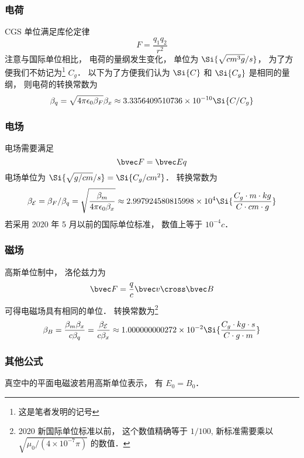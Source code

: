 

\subsubsection{电荷}
CGS 单位满足库伦定律
\begin{equation}\label{GaussU_eq1}
F = \frac{q_1 q_2}{r^2}
\end{equation}
注意与国际单位相比， 电荷的量纲发生变化， 单位为 $\Si{\sqrt{cm^3 g}/s}$， 为了方便我们不妨记为\footnote{这是笔者发明的记号} $C_g$． 以下为了方便我们认为 $\Si{C}$ 和 $\Si{C_g}$ 是相同的量纲， 则电荷的转换常数为
\begin{equation}
\beta_q = \sqrt{4\pi\epsilon_0\beta_F} \beta_x \approx 3.3356409510736\times 10^{-10} \Si{C/C_g}
\end{equation}

\subsubsection{电场}
电场需要满足
\begin{equation}
\bvec F = \bvec E q
\end{equation}
电场单位为 $\Si{\sqrt{g/cm}/s} = \Si{C_g/cm^2}$． 转换常数为
\begin{equation}
\beta_{\mathcal E} = \beta_F/\beta_q = \sqrt{\frac{\beta_m}{4\pi\epsilon_0 \beta_x}} \approx 2.997924580815998\times 10^4 \Si{\frac{C_g\cdot m\cdot kg}{C\cdot cm\cdot g}}
\end{equation}
若采用 2020 年 5 月以前的国际单位标准， 数值上等于 $10^{-4} c$．

\subsubsection{磁场}
高斯单位制中， 洛伦兹力为
\begin{equation}
\bvec F = \frac{q}{c} \bvec v \cross \bvec B
\end{equation}
可得电磁场具有相同的单位． 转换常数为\footnote{2020 新国际单位标准以前， 这个数值精确等于 $1/100$, 新标准需要乘以 $\sqrt{\mu_0/(4\times 10^{-7}\pi)}$ 的数值．}
\begin{equation}
\beta_B = \frac{\beta_m\beta_x}{c\beta_q} = \frac{\beta_{\mathcal E}}{c\beta_x} \approx 1.000000000272\times 10^{-2} \Si{\frac{C_g\cdot kg \cdot s}{C \cdot g \cdot m}}
\end{equation}

\subsubsection{其他公式}
真空中的平面电磁波若用高斯单位表示， 有 $E_0 = B_0$．

